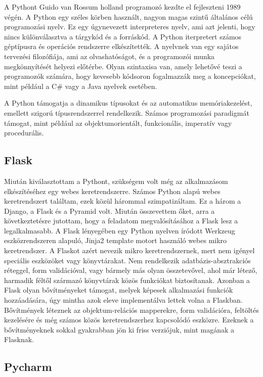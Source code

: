 A Pythont Guido van Rossum holland programozó kezdte el fejleszteni 1989 végén. A Python egy széles körben használt, nagyon magas szintű általános célú programozási nyelv. Ez egy úgynevezett interpreteres nyelv, ami azt jelenti, hogy nincs különválasztva a tárgykód és a forráskód. A Python iterpretert számos géptípusra és operációs rendszerre elkészítették. A nyelvnek van egy sajátos tervezési filozófiája, ami az olvashatóságot, és a programozói munka megkönnyítését helyezi előtérbe. Olyan szintaxisa van, amely lehetővé teszi a programozók számára, hogy kevesebb kódsoron fogalmazzák meg a koncepciókat, mint például a C\# vagy a Java nyelvek esetében.

A Python támogatja a dinamikus típusokat és az automatikus memóriakezelést, emellett szigorú típusrendszerrel rendelkezik. Számos programozási paradigmát támogat, mint például az objektumorientált, funkcionális, imperatív vagy procedurális.

\subsection{Flask}

Miután kiválasztottam a Pythont, szükségem volt még az alkalmazásom elkészítéséhez egy webes keretrendszerre. Számos Python alapú webes keretrendszert találtam, ezek közül hárommal szimpatizáltam. Ez a három a Django, a Flask és a Pyramid volt. Miután összevettem őket, arra a következtetésre jutottam, hogy a feladatom megvalósításához a Flask lesz a legalkalmasabb.
A Flask lényegében egy Python nyelven íródott Werkzeug eszközrendszeren alapuló, Jinja2 template motort használó webes mikro keretrendszer. A Flaskot azért nevezik mikro keretrendszernek, mert nem igényel speciális eszközöket vagy könyvtárakat. Nem rendelkezik adatbázis-absztrakciós réteggel, form validációval, vagy bármely más olyan összetevővel, ahol már létező, harmadik féltől származó könyvtárak közös funkciókat biztosítanak. Azonban a Flask olyan bővítményeket támogat, melyek képesek alkalmazási funkciók hozzáadására, úgy mintha azok eleve implementálva lettek volna a Flaskban. Bővítmények léteznek az objektum-relációs mapperekre, form validációra, feltöltés kezelésére és még számos közös keretrendszerhez kapcsolódó eszközre. Ezeknek a bővítményeknek sokkal gyakrabban jön ki friss verziójuk, mint magának a Flasknak.

\subsection{Pycharm}

